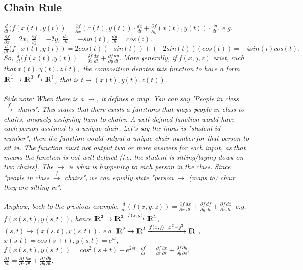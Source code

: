 \documentclass[addpoints]{exam}
\begin{document}
\subsection{
Chain Rule
}
\textit{
$\frac{d}{dt}(f(x(t),y(t))=\frac{\partial f}{\partial x}(x(t), y(t))\cdot \frac{dx}{dt}+\frac{\partial f}{\partial y}(x(t),y(t))\cdot \frac{dy}{dt}.$
}
\textit{
e.g. $\frac{\partial f}{\partial x}=2x$, $\frac{\partial f}{\partial y}=-2y$, $\frac{dx}{dt}=-sin(t)$, $\frac{dy}{dt}=cos(t).$ $\frac{d}{dt}(f(x(t),y(t))=2cos(t)(-sin(t))+(-2sin(t))(cos(t))=-4sin(t)cos(t).$ So, $\frac{d}{dt}(f(x(t),y(t))=\frac{\partial f}{\partial x}\frac{dx}{dt}+\frac{\partial f}{\partial y}\frac{dy}{dt}.$
}
\textit{
More generally, if $f(x,y,z)$ exist, such that $x(t), y(t), z(t),$ the composition denotes this function to have a form ${\rm I\!R}^1\rightarrow{\rm I\!R}^3\xrightarrow{f}{\rm I\!R}^1$, that is $t\mapsto(x(t),y(t),z(t)).$\\\\
Side note: When there is a $\rightarrow$, it defines a map. You can say "People in class $\xrightarrow{f}$ chairs". This states that there exists a  functions that maps people in class to chairs, uniquely assigning them to chairs. A well defined function would have each person assigned to a unique chair. Let's say the input is "student id number", then the function would output a unique chair number for that person to sit in. The function must not output two or more answers for each input, as that means the function is not well defined (i.e. the student is sitting/laying down on two chairs). The $\mapsto$ is what is happening to each person in the class. Since "people in class $\xrightarrow{f}$ chairs", we can equally state "person $\mapsto$ (maps to) chair they are sitting in".\\\\
}
\textit{
Anyhow, back to the previous example. $\frac{d}{dt}(f(x,y,z))=\frac{\partial f}{\partial x}\frac{dx}{dt}+\frac{\partial f }{\partial y}\frac{df}{dt}+\frac{\partial f}{\partial z}\frac{dz}{dt}.$
}
\textit{
e.g. $f(x(s,t),y(s,t))$, hence ${\rm I\!R}^2\rightarrow{\rm I\!R}^2\xrightarrow{f(x,y)}{\rm I\!R}^1$, $(s,t) \mapsto (x(s,t),y(s,t))$.
}
\textit{
e.g. ${\rm I\!R}^2\rightarrow{\rm I\!R}^2\xrightarrow{f(x,y)=x^2-y^2}{\rm I\!R}^1$, $x(s,t)=cos(s+t), y(s,t)=e^{st}$, $f(x(s,t),y(s,t))=cos^2(s+t)-e^{2st}.$
}
\textit{
$\frac{\partial f}{\partial s}=\frac{\partial f}{\partial x}\frac{\partial x}{\partial s}+\frac{\partial f}{\partial y}\frac{\partial y}{\partial s},$\\
$\frac{\partial f}{\partial t}=\frac{\partial f}{\partial x}\frac{\partial x}{\partial t}+\frac{\partial f}{\partial y}\frac{\partial y}{\partial t}.$\\\\
}
\end{document}
